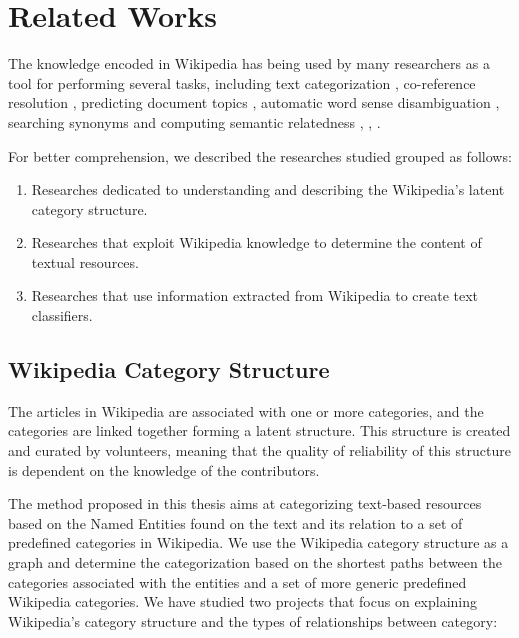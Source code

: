 \chapter{\hspace*{3pt} Related Works}
\label{chapter:related-works}


The knowledge encoded in Wikipedia has being used by many researchers as a tool for performing several tasks, including text categorization \cite{Gabrilovich:2006}, co-reference resolution \cite{strube2006wikirelate}, predicting document topics \cite{schonhofen2009identifying}, automatic word sense disambiguation \cite{mihalcea2007using}, searching synonyms \cite{krizhanovsky2006synonym} and computing semantic relatedness 
\cite{ponzetto2006exploiting}, \cite{gabrilovich2007computing}, \cite{milne2007computing}.

For better comprehension, we described the researches studied grouped as follows: 

\begin{enumerate}
\item Researches dedicated to understanding and describing the Wikipedia’s latent category structure.
\item Researches that exploit  Wikipedia knowledge to determine the content of textual resources.
\item Researches that use information extracted from Wikipedia to create text classifiers.
\end{enumerate}


\section{\hspace*{3pt}Wikipedia Category Structure}

The articles in Wikipedia are associated with one or more categories, and the categories are linked together forming a latent structure. This structure is created and curated by volunteers, meaning that the quality of reliability of this structure is dependent on the knowledge of the contributors.

The method proposed in this thesis aims at categorizing text-based resources based on the Named Entities found on the text and its relation to a set of predefined categories in Wikipedia. We use the Wikipedia category structure as a graph and determine the categorization based on the  shortest paths between the categories associated with the entities and a set of more generic predefined Wikipedia categories. We have studied two projects that focus on explaining Wikipedia’s category structure and the types of relationships between category: 


